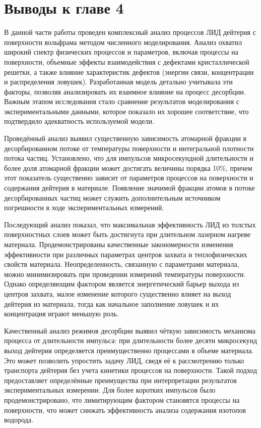 \section{Выводы к главе 4}

В данной части работы проведен комплексный анализ процессов ЛИД дейтерия с поверхности вольфрама методом численного моделирования. Анализ охватил широкий спектр физических процессов и параметров, включая процессы на поверхности, объемные эффекты взаимодействия с дефектами кристаллической решетки, а также влияние характеристик дефектов (энергии связи, концентрации и распределения ловушек). Разработанная модель детально учитывала эти факторы, позволяя анализировать их взаимное влияние на процесс десорбции. Важным этапом исследования стало сравнение результатов моделирования с экспериментальными данными, которое показало их хорошее соответствие, что подтвердило адекватность используемой модели.

Проведённый анализ выявил существенную зависимость атомарной фракции в десорбированном потоке от температуры поверхности и интегральной плотности потока частиц. Установлено, что для импульсов микросекундной длительности и более доля атомарной фракции может достигать величины порядка 10\%, причем этот показатель существенно зависит от параметров процессов на поверхности и содержания дейтерия в материале. Появление значимой фракции атомов в потоке десорбированных частиц может служить дополнительным источником погрешности в ходе экспериментальных измерений.

Последующий анализ показал, что максимальная эффективность ЛИД из толстых поверхностных слоев может быть достигнута при длительном лазерном нагреве материала. Продемонстрированы качественные закономерности изменения эффективности при различных параметрах центров захвата и теплофизических свойств материала. Неопределенность, связанную с параметрами материала, можно минимизировать при проведении измерений температуры поверхности. Однако определяющим фактором является энергетический барьер выхода из центров захвата, малое изменение которого существенно влияет на выход дейтерия из материала, тогда как начальное заполнение ловушек и их концентрация играют меньшую роль. 

Качественный анализ режимов десорбции выявил чёткую зависимость механизма процесса от длительности импульса: при длительности более десяти микросекунд выход дейтерия определяется преимущественно процессами в объеме материала. Это может позволить упростить задачу ЛИД, сведя её к рассмотрению только транспорта дейтерия без учета кинетики процессов на поверхности. Такой подход предоставляет определённые преимущества при интерпретации результатов экспериментальных измерении. Для более коротких импульсов было продемонстрировано, что лимитирующим фактором становятся процессы на поверхности, что может снижать эффективность анализа содержания изотопов водорода.


\clearpage
